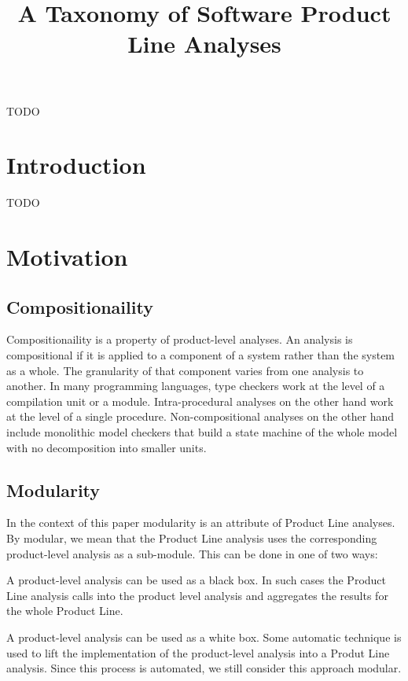 \documentclass{article}
\begin{document}
\title{A Taxonomy of Software Product Line Analyses}
\maketitle

\abstract
TODO

\section{Introduction}
TODO

\section{Motivation}

\subsection{Compositionaility}

Compositionaility is a property of product-level analyses. An analysis is compositional if it is applied to a component of a system rather than the system as a whole. The granularity of that component varies from one analysis to another. In many programming languages, type checkers work at the level of a compilation unit or a module. Intra-procedural analyses on the other hand work at the level of a single procedure. Non-compositional analyses on the other hand include monolithic model checkers that build a state machine of the whole model with no decomposition into smaller units.

\subsection{Modularity}

In the context of this paper modularity is an attribute of Product Line analyses. By modular, we mean that the Product Line analysis uses the corresponding product-level analysis as a sub-module. This can be done in one of two ways:

A product-level analysis can be used as a black box. In such cases the Product Line analysis calls into the product level analysis and aggregates the results for the whole Product Line.

A product-level analysis can be used as a white box. Some automatic technique is used to lift the implementation of the product-level analysis into a Produt Line analysis. Since this process is automated, we still consider this approach modular.
\end{document}
